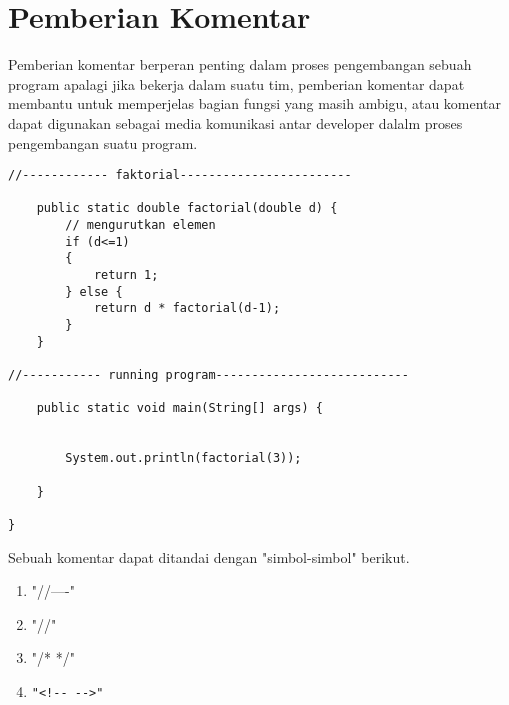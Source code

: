 \section{Pemberian Komentar}
\par 
Pemberian komentar berperan penting dalam proses pengembangan sebuah program apalagi jika bekerja dalam suatu tim, pemberian komentar dapat membantu untuk memperjelas bagian fungsi yang masih ambigu, atau komentar dapat digunakan sebagai media komunikasi antar developer dalalm proses pengembangan suatu program.

\begin{verbatim}
//------------ faktorial------------------------
	
	public static double factorial(double d) {
		// mengurutkan elemen
		if (d<=1)
		{
			return 1;
		} else {
			return d * factorial(d-1);
		}
	}
	
//----------- running program---------------------------
	
	public static void main(String[] args) {
	
		
		System.out.println(factorial(3));
		
	}

}
\end{verbatim}
\par 
Sebuah komentar dapat ditandai dengan "simbol-simbol" berikut.
\begin{enumerate}
\item "//----"
\item "//"
\item "/* */"
\item 
\begin{verbatim}
"<!-- -->"
\end{verbatim}

\end{enumerate}
